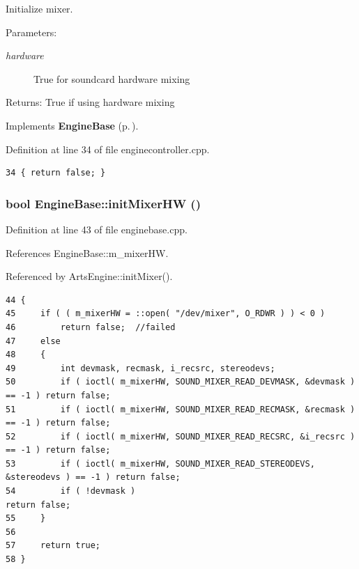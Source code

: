 Initialize mixer. \begin{Desc}
\item[Parameters:]
\begin{description}
\item[{\em hardware}]True for soundcard hardware mixing \end{description}
\end{Desc}
\begin{Desc}
\item[Returns:]True if using hardware mixing \end{Desc}


Implements {\bf Engine\-Base} {\rm (p.\,\pageref{classEngineBase_EngineBasea3})}.

Definition at line 34 of file enginecontroller.cpp.



\footnotesize\begin{verbatim}34 { return false; }
\end{verbatim}\normalsize 
{}
\subsubsection{\setlength{\rightskip}{0pt plus 5cm}bool Engine\-Base::init\-Mixer\-HW ()\hspace{0.3cm}{\tt  [protected, inherited]}}\label{classEngineBase_EngineBaseb1}




Definition at line 43 of file enginebase.cpp.

References Engine\-Base::m\_\-mixer\-HW.

Referenced by Arts\-Engine::init\-Mixer().



\footnotesize\begin{verbatim}44 {
45     if ( ( m_mixerHW = ::open( "/dev/mixer", O_RDWR ) ) < 0 )
46         return false;  //failed
47     else
48     {
49         int devmask, recmask, i_recsrc, stereodevs;
50         if ( ioctl( m_mixerHW, SOUND_MIXER_READ_DEVMASK, &devmask )       == -1 ) return false;
51         if ( ioctl( m_mixerHW, SOUND_MIXER_READ_RECMASK, &recmask )       == -1 ) return false;
52         if ( ioctl( m_mixerHW, SOUND_MIXER_READ_RECSRC, &i_recsrc )       == -1 ) return false;
53         if ( ioctl( m_mixerHW, SOUND_MIXER_READ_STEREODEVS, &stereodevs ) == -1 ) return false;
54         if ( !devmask )                                                           return false;
55     }
56 
57     return true;
58 }
\end{verbatim}\normalsize 
{}
